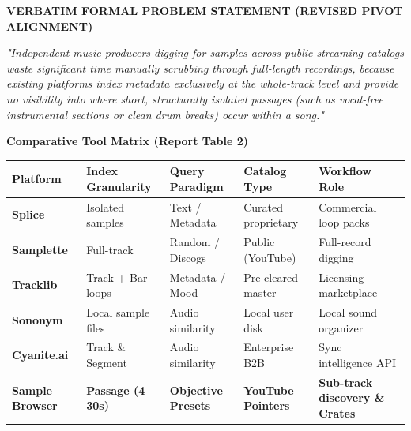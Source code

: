 \begin{frame}[t]

  \begin{tcolorbox}[standardcard, top=3pt, bottom=3pt]
    {\tiny\bfseries\textcolor{accentemerald}{VERBATIM FORMAL PROBLEM STATEMENT (REVISED PIVOT ALIGNMENT)}}\par\vspace{0.6mm}
    {\scriptsize\itshape\textcolor{textwhite}{"Independent music producers digging for samples across public streaming catalogs waste significant time manually scrubbing through full-length recordings, because existing platforms index metadata exclusively at the whole-track level and provide no visibility into where short, structurally isolated passages (such as vocal-free instrumental sections or clean drum breaks) occur within a song."}}
  \end{tcolorbox}

  \vspace{1.5mm}

  \begin{tcolorbox}[standardcard, top=3pt, bottom=3pt]
    {\scriptsize\bfseries\textcolor{textwhite}{Comparative Tool Matrix (Report Table 2)}}\par\vspace{1mm}
    \tiny
    \begin{tabularx}{\textwidth}{@{}l l l l X@{}}
      \toprule
      \textbf{Platform} & \textbf{Index Granularity} & \textbf{Query Paradigm} & \textbf{Catalog Type} & \textbf{Workflow Role} \\
      \midrule
      \textbf{Splice} & Isolated samples & Text / Metadata & Curated proprietary & Commercial loop packs \\
      \textbf{Samplette} & Full-track & Random / Discogs & Public (YouTube) & Full-record digging \\
      \textbf{Tracklib} & Track + Bar loops & Metadata / Mood & Pre-cleared master & Licensing marketplace \\
      \textbf{Sononym} & Local sample files & Audio similarity & Local user disk & Local sound organizer \\
      \textbf{Cyanite.ai} & Track \& Segment & Audio similarity & Enterprise B2B & Sync intelligence API \\
      \midrule
      \textbf{\textcolor{accentemerald}{Sample Browser}} & \textbf{\textcolor{accentemerald}{Passage (4--30s)}} & \textbf{\textcolor{accentemerald}{Objective Presets}} & \textbf{\textcolor{accentemerald}{YouTube Pointers}} & \textbf{\textcolor{accentemerald}{Sub-track discovery \& Crates}} \\
      \bottomrule
    \end{tabularx}
  \end{tcolorbox}
\end{frame}
